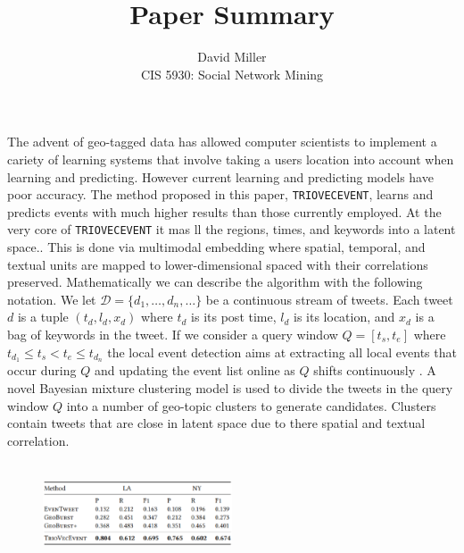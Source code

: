 \documentclass[12pt]{article}
\theoremstyle{remark}
\begin{document}
	
	\title{Paper Summary}
	\author{David Miller \\ 
		CIS 5930: Social Network Mining} 
	
	\maketitle 
	
	The advent of geo-tagged data has allowed computer scientists to implement a cariety of learning systems that involve taking a users location into account when learning and predicting. However current learning and predicting models have poor accuracy. The method proposed in this paper, \texttt{TRIOVECEVENT}, learns and predicts events with much higher results than those currently employed. At the very core of \texttt{TRIOVECEVENT} it mas ll the regions, times, and keywords into a latent space.. This is done via multimodal embedding where spatial, temporal, and textual units are mapped to lower-dimensional spaced with their correlations preserved. Mathematically we can describe the algorithm with the following notation. We let $\mathcal{D} = \{d_1, \dots, d_n, \dots\}$ be a continuous stream of tweets. Each tweet $d$ is a tuple $(t_d, l_d, x_d)$ where $t_d$ is its post time, $l_d$ is its location, and $x_d$ is a bag of keywords in the tweet. If we consider a query window $Q = [t_s, t_e]$ where $t_{d_1} \leq t_s < t_e \leq t_{d_n}$ the local event detection aims at extracting all local events that occur during $Q$ and updating the event list online as $Q$ shifts continuously \cite{paper}. A novel Bayesian mixture clustering model is used to divide the tweets in the query window $Q$ into a number of geo-topic clusters to generate candidates. Clusters contain tweets that are close in latent space due to there spatial and textual correlation. 
	\begin{figure}
		\vspace{-15pt}
		\hspace{0pt}
		\includegraphics[height=3cm,width=0.5\textwidth]{fig1.eps}
		\caption{}
		\vspace{-14pt}
	\end{figure} 
\end{document}
